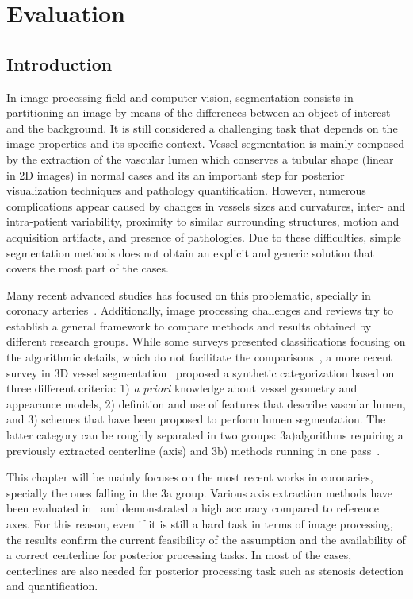 \chapter{Evaluation}
%

\section{Introduction}
%
In image processing field and computer vision, segmentation consists in partitioning an image by means of the differences between an object of interest and the background. It is still considered a challenging task that depends on the image properties and its specific context. Vessel segmentation is mainly composed by the extraction of the vascular lumen which conserves a tubular shape (linear in 2D images) in normal cases and its an important step for posterior visualization techniques and pathology quantification. However, numerous complications appear caused by changes in vessels sizes and curvatures, inter- and intra-patient variability, proximity to similar surrounding structures, motion and acquisition artifacts, and presence of pathologies. Due to these difficulties, simple segmentation methods does not obtain an explicit and generic solution that covers the most part of the cases.

Many recent advanced studies has focused on this problematic, specially in coronary arteries~\citep{Lesage2009Thesis, Schaap2010Thesis, Wang2011Thesis, Zuluaga2011Thesis}. Additionally, image processing challenges and reviews try to establish a general framework to compare methods and results obtained by different research groups. While some surveys presented classifications focusing on the algorithmic details, which do not facilitate the comparisons~\citep{Kirbas2004}, a more recent survey in 3D vessel segmentation~\citep{Lesage2009b} proposed a synthetic categorization based on three different criteria: 1) \textit{a priori} knowledge about vessel geometry and appearance models, 2) definition and use of features that describe vascular lumen, and 3) schemes that have been proposed to perform lumen segmentation. The latter category can be roughly separated in two groups: 3a)algorithms requiring a previously extracted centerline (axis) and 3b) methods running in one pass~\citep{Schaap2011}.

This chapter will be mainly focuses on the most recent works in coronaries, specially the ones falling in the 3a group. Various axis extraction methods have been evaluated in~\citep{Metz2008} and demonstrated a high accuracy compared to reference axes. For this reason, even if it is still a hard task in terms of image processing, the results confirm the current feasibility of the assumption and the availability of a correct centerline for posterior processing tasks. In most of the cases, centerlines are also needed for posterior processing task such as stenosis detection and quantification.

